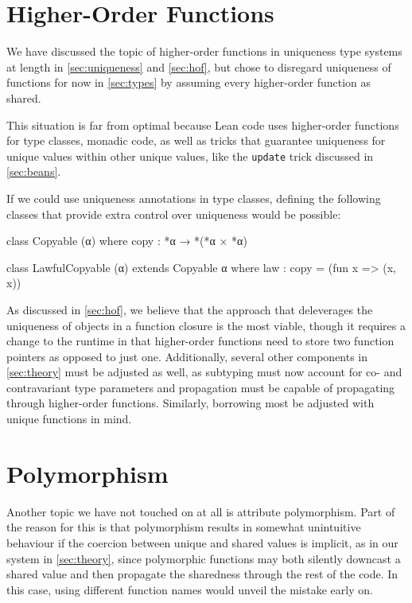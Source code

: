 \section{Higher-Order Functions}
We have discussed the topic of higher-order functions in uniqueness type systems at length in \cref{sec:uniqueness} and \cref{sec:hof}, but chose to disregard uniqueness of functions for now in \cref{sec:types} by assuming every higher-order function as shared. 

This situation is far from optimal because Lean code uses higher-order functions for type classes, monadic code, as well as tricks that guarantee uniqueness for unique values within other unique values, like the \lstinline|update| trick discussed in \cref{sec:beans}. 

If we could use uniqueness annotations in type classes, defining the following classes that provide extra control over uniqueness would be possible:

\begin{code}
class Copyable (α) where
  copy : *α → *(*α × *α)
  
class LawfulCopyable (α) extends Copyable α where
  law : copy = (fun x => (x, x))
\end{code}

As discussed in \cref{sec:hof}, we believe that the approach that deleverages the uniqueness of objects in a function closure is the most viable, though it requires a change to the runtime in that higher-order functions need to store two function pointers as opposed to just one. Additionally, several other components in \cref{sec:theory} must be adjusted as well, as subtyping must now account for co- and contravariant type parameters and propagation must be capable of propagating through higher-order functions. Similarly, borrowing most be adjusted with unique functions in mind.

\section{Polymorphism}
Another topic we have not touched on at all is attribute polymorphism. Part of the reason for this is that polymorphism results in somewhat unintuitive behaviour if the coercion between unique and shared values is implicit, as in our system in \cref{sec:theory}, since polymorphic functions may both silently downcast a shared value and then propagate the sharedness through the rest of the code. In this case, using different function names would unveil the mistake early on.

